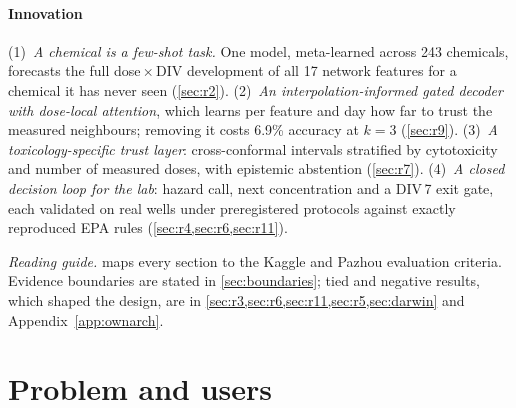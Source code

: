 \documentclass[11pt,a4paper]{article}
\newcommand{\appref}[1]{Appendix~\ref{#1}}
\newcommand{\nChem}{243}
\begin{document}
\paragraph{Innovation}
(1)~\emph{A chemical is a few-shot task.} One model, meta-learned across \nChem{} chemicals, forecasts the full
dose\,\(\times\)\,DIV development of all 17 network features for a chemical it has never seen (\cref{sec:r2}).
(2)~\emph{An interpolation-informed gated decoder with dose-local attention}, which learns per feature and day
how far to trust the measured neighbours; removing it costs
6.9\% accuracy at \(k=3\) (\cref{sec:r9}).
(3)~\emph{A toxicology-specific trust layer}: cross-conformal intervals stratified by cytotoxicity and number of
measured doses, with epistemic abstention (\cref{sec:r7}). (4)~\emph{A closed decision loop for the lab}: hazard
call, next concentration and a DIV\,7 exit gate, each validated on real wells under preregistered protocols
against exactly reproduced EPA rules (\cref{sec:r4,sec:r6,sec:r11}).

{\small\color{muted}\noindent\textit{Reading guide.}  maps every section to the Kaggle and
Pazhou evaluation criteria. Evidence boundaries are stated in \cref{sec:boundaries}; tied and negative results,
which shaped the design, are in \cref{sec:r3,sec:r6,sec:r11,sec:r5,sec:darwin} and \appref{app:ownarch}.\par}

\section{Problem and users}\label{sec:problem}
\end{document}
